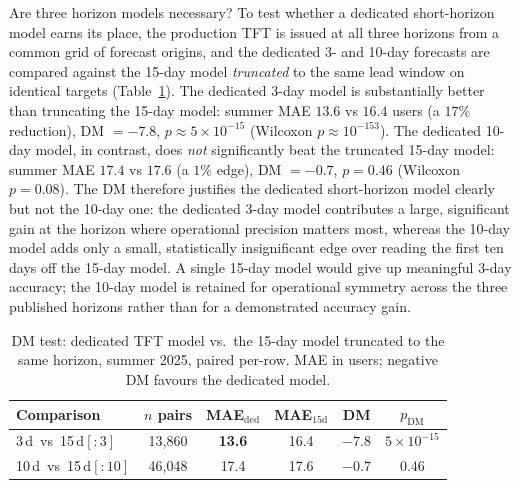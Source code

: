 \documentclass[twocolumn,twoside,a4paper,10pt]{IEEEtran}
\begin{document}
Are three horizon models necessary? To test whether a dedicated short-horizon model earns its place, the production TFT is issued at all three horizons from a common grid of forecast origins, and the dedicated 3- and 10-day forecasts are compared against the 15-day model \emph{truncated} to the same lead window on identical targets (Table~\ref{tab:dmh}). The dedicated 3-day model is substantially better than truncating the 15-day model: summer MAE $13.6$ vs $16.4$ users (a $17\%$ reduction), DM $=-7.8$, $p\approx5\times10^{-15}$ (Wilcoxon $p\approx10^{-153}$). The dedicated 10-day model, in contrast, does \emph{not} significantly beat the truncated 15-day model: summer MAE $17.4$ vs $17.6$ (a $1\%$ edge), DM $=-0.7$, $p=0.46$ (Wilcoxon $p=0.08$). The DM therefore justifies the dedicated short-horizon model clearly but not the 10-day one: the dedicated 3-day model contributes a large, significant gain at the horizon where operational precision matters most, whereas the 10-day model adds only a small, statistically insignificant edge over reading the first ten days off the 15-day model. A single 15-day model would give up meaningful 3-day accuracy; the 10-day model is retained for operational symmetry across the three published horizons rather than for a demonstrated accuracy gain.

\begin{table}[!t]
    \caption{DM test: dedicated TFT model vs.\ the 15-day model truncated to the same horizon, summer 2025, paired per-row. MAE in users; negative DM favours the dedicated model.}
    \label{tab:dmh}
    \begin{center}
    \footnotesize
    \setlength{\tabcolsep}{4pt}
    \begin{tabular}{lccccc}
        \toprule
        Comparison & $n$ pairs & MAE$_\text{ded}$ & MAE$_{15\text{d}}$ & DM & $p_\text{DM}$ \\
        \midrule
        3\,d\ vs\ 15\,d$[:3]$   & 13{,}860 & \textbf{13.6} & 16.4 & $-7.8$ & $5\!\times\!10^{-15}$ \\
        10\,d\ vs\ 15\,d$[:10]$ & 46{,}048 & 17.4 & 17.6 & $-0.7$ & $0.46$ \\
        \bottomrule
    \end{tabular}
    \end{center}
\end{table}
\end{document}
